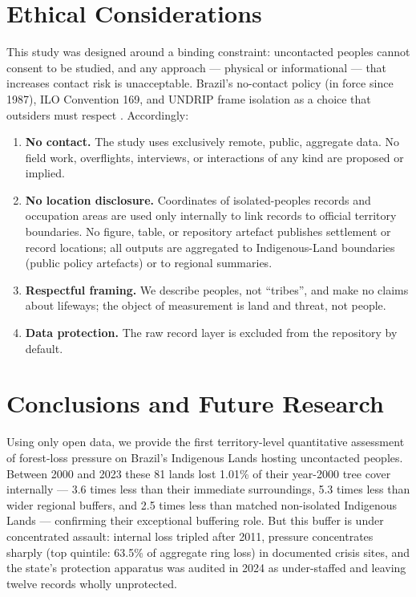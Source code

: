 \section{Ethical Considerations}\label{sec:ethics}

This study was designed around a binding constraint: uncontacted peoples cannot consent to be studied, and any approach --- physical or informational --- that increases contact risk is unacceptable. Brazil's no-contact policy (in force since 1987), ILO Convention 169, and UNDRIP frame isolation as a choice that outsiders must respect \citep{pringle2014,ilo169,undrip}. Accordingly:

\begin{enumerate}[leftmargin=1.4em, itemsep=1pt]
\item \textbf{No contact.} The study uses exclusively remote, public, aggregate data. No field work, overflights, interviews, or interactions of any kind are proposed or implied.
\item \textbf{No location disclosure.} Coordinates of isolated-peoples records and occupation areas are used only internally to link records to official territory boundaries. No figure, table, or repository artefact publishes settlement or record locations; all outputs are aggregated to Indigenous-Land boundaries (public policy artefacts) or to regional summaries.
\item \textbf{Respectful framing.} We describe peoples, not ``tribes'', and make no claims about lifeways; the object of measurement is land and threat, not people.
\item \textbf{Data protection.} The raw record layer is excluded from the repository by default.
\end{enumerate}

\section{Conclusions and Future Research}\label{sec:conclusion}

Using only open data, we provide the first territory-level quantitative assessment of forest-loss pressure on Brazil's Indigenous Lands hosting uncontacted peoples. Between 2000 and 2023 these 81 lands lost 1.01\% of their year-2000 tree cover internally --- 3.6 times less than their immediate surroundings, 5.3 times less than wider regional buffers, and 2.5 times less than matched non-isolated Indigenous Lands --- confirming their exceptional buffering role. But this buffer is under concentrated assault: internal loss tripled after 2011, pressure concentrates sharply (top quintile: 63.5\% of aggregate ring loss) in documented crisis sites, and the state's protection apparatus was audited in 2024 as under-staffed and leaving twelve records wholly unprotected.

